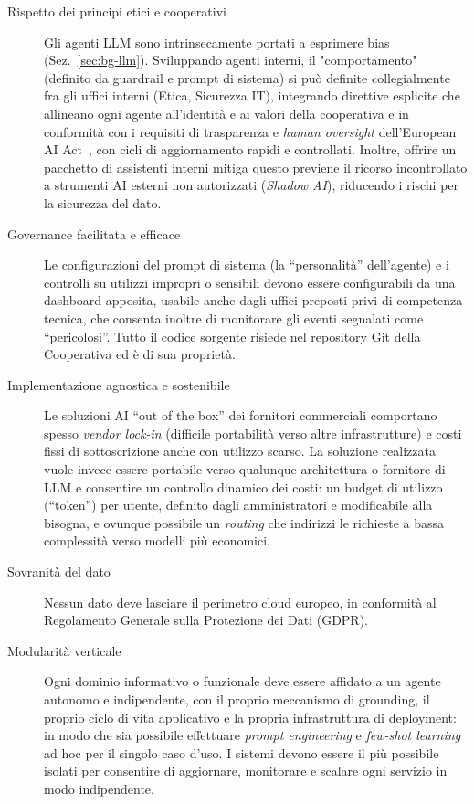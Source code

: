 \begin{description}

  \item[Rispetto dei principi etici e cooperativi]
    Gli agenti LLM sono intrinsecamente portati a esprimere bias (Sez.~\ref{sec:bg-llm}).
    Sviluppando agenti interni, il  "comportamento" (definito da guardrail 
    e prompt di sistema) si può definite collegialmente fra gli uffici interni (Etica, Sicurezza IT),
    integrando direttive esplicite che allineano ogni agente all'identità e ai valori
    della cooperativa e in conformità con i requisiti di trasparenza e \emph{human oversight}
    dell'European AI Act~\cite{eu2024aiact}, con cicli di aggiornamento rapidi e controllati.
    Inoltre, offrire un pacchetto di assistenti interni mitiga questo previene il
    ricorso incontrollato a strumenti AI esterni non autorizzati (\emph{Shadow AI}), riducendo i rischi per
    la sicurezza del dato.

  \item[Governance facilitata e efficace]
    Le configurazioni del prompt di sistema (la ``personalità'' dell'agente) e i controlli su
    utilizzi impropri o sensibili devono essere configurabili da una dashboard apposita, 
    usabile anche dagli uffici preposti privi di competenza tecnica, che consenta inoltre di monitorare
    gli eventi segnalati come ``pericolosi''. Tutto il codice sorgente risiede nel repository 
    Git della Cooperativa ed è di sua proprietà.

  \item[Implementazione agnostica e sostenibile]
    Le soluzioni AI ``out of the box'' dei fornitori commerciali comportano spesso \emph{vendor lock-in}
    (difficile portabilità verso altre infrastrutture) e costi fissi di sottoscrizione anche con
    utilizzo scarso. La soluzione realizzata vuole invece essere portabile verso qualunque
    architettura o fornitore di LLM e consentire un controllo dinamico dei costi: un budget di utilizzo (``token'')
    per utente, definito dagli amministratori e modificabile alla bisogna, e ovunque possibile un
    \emph{routing} che indirizzi le richieste a bassa complessità verso modelli più economici.

  \item[Sovranità del dato]
    Nessun dato deve lasciare il perimetro cloud europeo, in conformità al Regolamento Generale sulla Protezione dei Dati (GDPR).

  \item[Modularità verticale]
    Ogni dominio informativo o funzionale deve essere affidato a un agente autonomo e indipendente,
    con il proprio meccanismo di grounding, il proprio ciclo di vita applicativo e la propria infrastruttura di deployment:
    in modo che sia possibile effettuare \emph{prompt engineering} e \emph{few-shot learning}~\cite{brown2020gpt3}
    ad hoc per il singolo caso d'uso.
    I sistemi devono essere il più possibile isolati per consentire di aggiornare, monitorare e
    scalare ogni servizio in modo indipendente.


\end{description}
